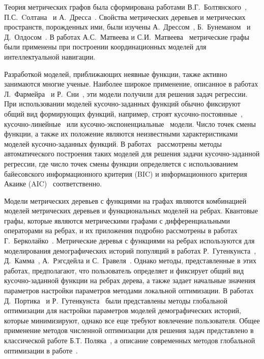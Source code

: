 Теория метрических графов была сформирована работами В.Г.~Болтянского~\cite{болтянский1978комбинаторная}, П.С.~Cолтана~\cite{soltan1973экстремальные,болтянский1978комбинаторная} и А.~Дресса~\cite{dress1984trees}.
Свойства метрических деревьев и метрических пространств, порожденных ими, были изучены А.~Дрессом~\cite{dress1984trees}, Б.~Бунеманом~\cite{buneman1974note} и Д.~Олдосом~\cite{aldous1991continuum_i,aldous1991continuum,aldous1993continuum}.
В работах А.С.~Матвеева и С.И.~Матвеева~\cite{матвеев2010создание,лёвин2011системы,матвеев2013интеллектуальная} метрические графы были применены при построении координационных моделей для интеллектуальной навигации.

Разработкой моделей, приближающих неявные функции, также активно занимаются многие ученые.
Наиболее широкое применение, описанное в работах Л.~Фармейра~\cite{fahrmeir2013regression} и Р.~Сни~\cite{snee1977validation}, эти модели получили для решения задач регрессии.
При использовании моделей кусочно-заданных функций обычно фиксируют общий вид формирующих функций, например, строят кусочно-постоянные~\cite{schiffels2020msmc,dai2008nonlinear}, кусочно-линейные~\cite{leenaerts2013piecewise} или кусочно-экспоненциальные~\cite{friedman1982piecewise} модели.
Число точек смены функции, а также их положение являются неизвестными характеристиками моделей кусочно-заданных функций.
В работах~\cite{muggeo2020selecting,malash2010piecewise} рассмотрены методы автоматического построения таких моделей для решения задачи кусочно-заданной регрессии, где число точек смены функции определяется с использованием байесовского информационного критерия (BIC) и информационного критерия Акаике (AIC)~\cite{akaike1974new} соответственно.

Модели метрических деревьев с функциями на графах являются комбинацией моделей метрических деревьев и функциональных моделей на ребрах.
Квантовые графы, которые являются метрическими графами с дифференциальными операторами на ребрах, и их приложения подробно рассмотрены в работах Г.~Берколайко~\cite{berkolaiko2006quantum,berkolaiko2013introduction}.
Метрические деревья с функциями на ребрах используются для моделирования демографических историй популяций в работах Р.~Гутенкунста~\cite{gutenkunst2009inferring}, Д.~Камма~\cite{kamm2020efficiently}, А.~Рэгсдейла и С.~Гравеля~\cite{ragsdale2019models, ragsdale2020unbiased}.
Однако методы, представленные в этих работах, предполагают, что пользователь определяет и фиксирует общий вид кусочно-заданной функции на ребрах дерева, а также задает начальные значения параметров настройки параметров методами локальной оптимизации.
В работах Д.~Портика~\cite{portik2017evaluating, leache2019exploring} и Р.~Гутенкунста~\cite{blischak2020inferring} были представлены методы глобальной оптимизации для настройки параметров моделей демографических историй, которые минимизируют, однако все еще требуют вовлечение пользователя.
Общее применение методов численной оптимизации для решения задач представлено в классической работе Б.Т. Поляка~\cite{поляк1983введение}, а описание современных методов глобальной оптимизации в работе~\cite{пантелеев2013методы}.


